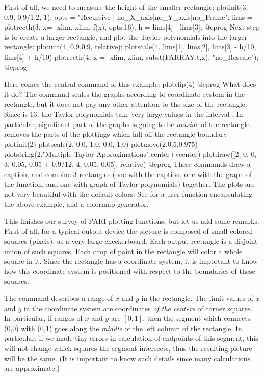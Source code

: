 First of all, we need to measure the height of the smaller rectangle:
\bprog
  plotinit(3, 0.9, 0.9/1.2, 1);
  opts = "Recursive | no_X_axis|no_Y_axis|no_Frame";
  lims = plotrecth(3, x= -xlim, xlim, f(x), opts,16);
  h = lims[4] - lims[3];
@eprog\noindent
Next step is to create a larger rectangle, and plot the Taylor polynomials
into the larger rectangle:
\bprog
  plotinit(4, 0.9,0.9, relative);
  plotscale(4, lims[1], lims[2], lims[3] - h/10, lims[4] + h/10)
  plotrecth(4, x = -xlim, xlim, subst(FARRAY,t,x), "no_Rescale");
@eprog

Here comes the central command of this example:
\bprog
  plotclip(4)
@eprog\noindent
What does it do?  The command  scales the
graphs according to coordinate system in the rectangle, but it does not pay
any other attention to the size of the rectangle.  Since  is 13,
the Taylor polynomials take very large values in the interval
.  In particular, significant part of the graphs is going
to be \emph{outside} of the rectangle.  removes the parts of
the plottings which fall off the rectangle boundary
\bprog
  plotinit(2)
  plotscale(2, 0.0, 1.0, 0.0, 1.0)
  plotmove(2,0.5,0.975)
  plotstring(2,"Multiple Taylor Approximations",center+vcenter)
  plotdraw([2, 0, 0,  3, 0.05, 0.05 + 0.9/12,  4, 0.05, 0.05], relative)
@eprog\noindent
These commands draw a caption, and combine 3 rectangles (one with the
caption, one with the graph of the function, and one with graph of Taylor
polynomials) together. The plots are not very beautiful with the default
colors. See  for a user function encapsulating the
above example, and a colormap generator.

This finishes our survey of PARI plotting functions, but let us add
some remarks.  First of all, for a typical output device the picture is
composed of small colored squares (pixels), as a very large checkerboard.
Each output rectangle is a disjoint union of such squares.  Each drop
of paint in the rectangle will color a whole square in it.  Since the
rectangle has a coordinate system, it is important to know how this
coordinate system is positioned with respect to the boundaries of these
squares.

The command  describes a range of $x$ and $y$ in the
rectangle.  The limit values of $x$ and $y$ in the coordinate system are
coordinates \emph{of the centers} of corner squares.  In particular,
if ranges of $x$ and $y$ are $[0,1]$, then the segment which connects (0,0)
with (0,1) goes along the \emph{middle} of the left column of the rectangle.
In particular, if we made tiny errors in calculation of endpoints of this
segment, this will not change which squares the segment intersects, thus
the resulting picture will be the same.  (It is important to know such details
since many calculations are approximate.)

